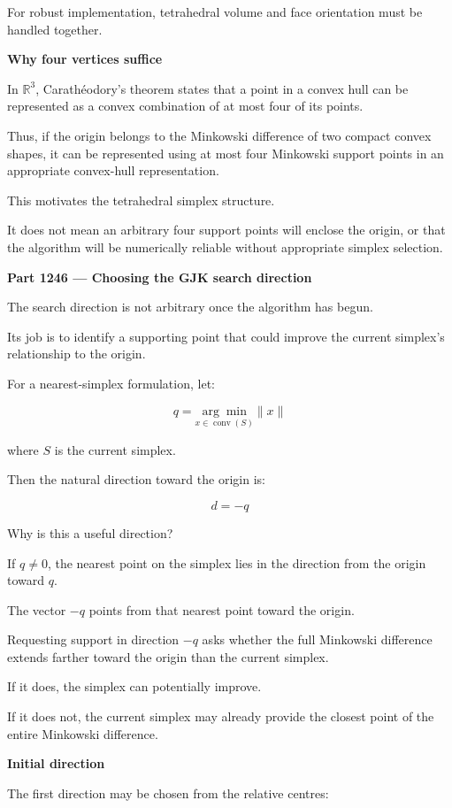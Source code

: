 For robust implementation, tetrahedral volume and face orientation must be handled together.

\textbf{Why four vertices suffice}

In \(\mathbb R^3\), Carathéodory's theorem states that a point in a convex hull can be represented as a convex combination of at most four of its points.

Thus, if the origin belongs to the Minkowski difference of two compact convex shapes, it can be represented using at most four Minkowski support points in an appropriate convex-hull representation.

This motivates the tetrahedral simplex structure.

It does not mean an arbitrary four support points will enclose the origin, or that the algorithm will be numerically reliable without appropriate simplex selection.

\textbf{Part 1246 --- Choosing the GJK search direction}

The search direction is not arbitrary once the algorithm has begun.

Its job is to identify a supporting point that could improve the current simplex's relationship to the origin.

For a nearest-simplex formulation, let:

\[
q= \underset{x\in\operatorname{conv}(S)}{\arg\min} \|x\|
\]

where \(S\) is the current simplex.

Then the natural direction toward the origin is:

\[
\boxed{ d=-q }
\]

Why is this a useful direction?

If \(q\ne0\), the nearest point on the simplex lies in the direction from the origin toward \(q\).

The vector \(-q\) points from that nearest point toward the origin.

Requesting support in direction \(-q\) asks whether the full Minkowski difference extends farther toward the origin than the current simplex.

If it does, the simplex can potentially improve.

If it does not, the current simplex may already provide the closest point of the entire Minkowski difference.

\textbf{Initial direction}

The first direction may be chosen from the relative centres:

